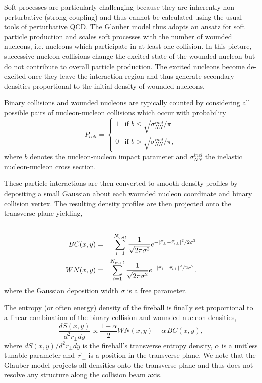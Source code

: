 \documentclass[aps,prc,reprint,amsmath,nofootinbib]{revtex4-1}
\begin{document}
Soft processes are particularly challenging because they are inherently non-perturbative (strong coupling) and thus cannot be calculated using the usual tools
of perturbative QCD. The Glauber model thus adopts an ansatz for soft particle production and scales soft processes with the number of wounded nucleons, i.e. nucleons 
which participate in at least one collision. In this picture, successive nucleon collisions change the excited state of the wounded nucleon but do not contribute to 
overall particle production. The excited nucleons become de-excited once they leave the interaction region and thus generate secondary densities proportional to the 
initial density of wounded nucleons.

Binary collisions and wounded nucleons are typically counted by considering all possible pairs of nucleon-nucleon collisions which occur with probability
\begin{equation}
P_{coll}=
\begin{cases}
  1 &\mbox{if } b \le \sqrt{\sigma^{inel}_{NN}/\pi} \\ 
  0 &\mbox{if } b > \sqrt{\sigma^{inel}_{NN}/\pi},
\end{cases}
\end{equation}
where $b$ denotes the nucleon-nucleon impact parameter and $\sigma^{inel}_{NN}$ the inelastic nucleon-nucleon cross section.

These particle interactions are then converted to smooth density profiles by depositing a small Gaussian about each wounded nucleon coordinate and binary
collision vertex. The resulting density profiles are then projected onto the transverse plane yielding,
\begin{eqnarray}
 \label{BC_WN}
 \cr BC(x,y) &=& \sum_{i=1}^{N_{coll}} \frac{1}{\sqrt{2 \pi \sigma^2}} e^{ -|\vec{r}_\perp-\vec{r}_{i\perp}|^2/2 \sigma^2 }   \\
 WN(x,y) &=& \sum_{i=1}^{N_{part}} \frac{1}{\sqrt{2 \pi \sigma^2}} e^{ -|\vec{r}_\perp-\vec{r}_{i\perp}|^2/2 \sigma^2 } .
\end{eqnarray}
where the Gaussian deposition width $\sigma$ is a free parameter.

The entropy (or often energy) density of the fireball is finally set proportional to a linear combination of the binary collision and wounded nucleon densities,
\begin{equation}
 \frac{dS(x,y)}{d^2r_\perp dy} \propto \frac{1-\alpha}{2} WN(x,y) + \alpha\, BC(x,y),
\end{equation}
where $dS(x,y)/d^2r_\perp dy$ is the fireball's transverse entropy density, $\alpha$ is a unitless tunable parameter and $\vec{r}_\perp$ is a position in the 
transverse plane. We note that the Glauber model projects all densities onto the transverse plane and thus does not resolve any structure along the collision beam axis.
\end{document}

